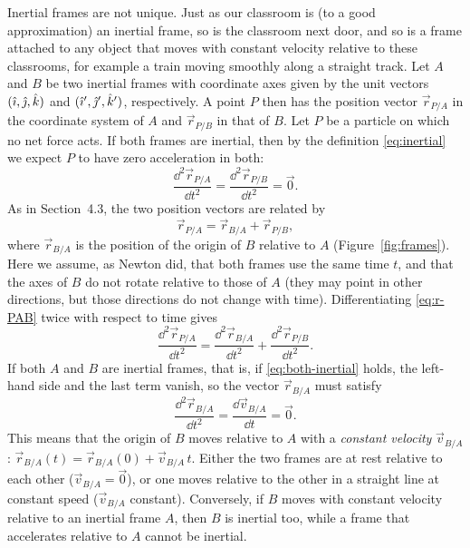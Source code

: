 \documentclass[11pt,a4paper]{article}
\begin{document}
Inertial frames are not unique. Just as our classroom is (to a good approximation) an inertial
frame, so is the classroom next door, and so is a frame attached to any object that moves with
constant velocity relative to these classrooms, for example a train moving smoothly along a
straight track. Let $A$
and $B$ be two inertial frames with coordinate axes given by the unit vectors $(\hat{\imath}, \hat{\jmath},
\hat{k})$ and $(\hat{\imath}', \hat{\jmath}', \hat{k}')$, respectively. A point $P$ then has the position vector
$\vec{r}_{P/A}$ in the coordinate system of $A$ and $\vec{r}_{P/B}$ in that of $B$. Let $P$ be a
particle on which no net force acts. If both frames are inertial, then by the definition
\eqref{eq:inertial} we expect $P$ to have zero acceleration in both:
\begin{equation}\label{eq:both-inertial}
  \frac{\dd^2\vec{r}_{P/A}}{\dd t^2} = \frac{\dd^2\vec{r}_{P/B}}{\dd t^2} = \vec{0} .
\end{equation}
As in Section~4.3, the two position vectors are related by
\begin{equation}\label{eq:r-PAB}
  \vec{r}_{P/A} = \vec{r}_{B/A} + \vec{r}_{P/B} ,
\end{equation}
where $\vec{r}_{B/A}$ is the position of the origin of $B$ relative to $A$
(Figure~\ref{fig:frames}). Here we assume, as Newton did, that both frames use the same time $t$,
and that the axes of $B$ do not rotate relative to those of $A$ (they may point in other
directions, but those directions do not change with time). Differentiating \eqref{eq:r-PAB} twice
with respect to time gives
\[
  \frac{\dd^2\vec{r}_{P/A}}{\dd t^2} = \frac{\dd^2\vec{r}_{B/A}}{\dd t^2} + \frac{\dd^2\vec{r}_{P/B}}{\dd t^2} .
\]
If both $A$ and $B$ are inertial frames, that is, if \eqref{eq:both-inertial} holds, the left-hand
side and the last term vanish, so the vector $\vec{r}_{B/A}$ must satisfy
\begin{equation}\label{eq:aBA}
  \frac{\dd^2\vec{r}_{B/A}}{\dd t^2} = \frac{\dd\vec{v}_{B/A}}{\dd t} = \vec{0} .
\end{equation}
This means that the origin of $B$ moves relative to $A$ with a \emph{constant velocity}
$\vec{v}_{B/A}$: $\vec{r}_{B/A}(t) = \vec{r}_{B/A}(0) + \vec{v}_{B/A}\,t$. Either the two frames
are at rest relative to each other ($\vec{v}_{B/A} = \vec{0}$), or one moves relative to the other
in a straight line at constant speed ($\vec{v}_{B/A}$ constant). Conversely, if $B$ moves with
constant velocity relative to an inertial frame $A$, then $B$ is inertial too, while a frame that
accelerates relative to $A$ cannot be inertial.
\end{document}
